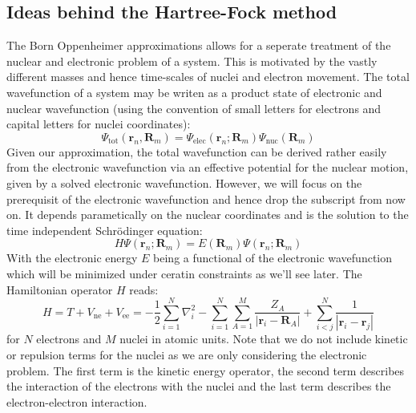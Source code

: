 \subsection{Ideas behind the Hartree-Fock method}
\label{subsec:background_hf}
The Born Oppenheimer approximations allows for a seperate treatment of the nuclear and electronic problem of a system. This is motivated by the vastly different masses and hence time-scales of nuclei and electron movement. The total wavefunction of a system may be writen as a product state of electronic and nuclear wavefunction (using the convention of small letters for electrons and capital letters for nuclei coordinates):
\begin{equation}
    \Psi_{\text{tot}}(\mathbf{r}_n, \mathbf{R}_m) = \Psi_{\text{elec}}(\mathbf{r}_n; \mathbf{R}_m) \Psi_{\text{nuc}}(\mathbf{R}_m)
\end{equation}
Given our approximation, the total wavefunction can be derived rather easily from the electronic wavefunction via an effective potential for the nuclear motion, given by a solved electronic wavefunction. However, we will focus on the prerequisit of the electronic wavefunction and hence drop the subscript from now on. It depends parametically on the nuclear coordinates and is the solution to the time independent Schrödinger equation:
\begin{equation}
    H \Psi(\mathbf{r}_n; \mathbf{R}_m) = E(\mathbf{R}_m) \Psi(\mathbf{r}_n; \mathbf{R}_m)
\end{equation}
With the electronic energy $E$ being a functional of the electronic wavefunction which will be minimized under ceratin constraints as we'll see later. 
The Hamiltonian operator $H$ reads: 
\begin{equation}
    H = T + V_{\text{ne}} + V_{\text{ee}} = -\frac{1}{2} \sum_{i=1}^N \nabla_i^2 - \sum_{i=1}^N \sum_{A=1}^M \frac{Z_A}{|\mathbf{r}_i - \mathbf{R}_A|} + \sum_{i<j}^N \frac{1}{|\mathbf{r}_i - \mathbf{r}_j|}
\end{equation}
for $N$ electrons and $M$ nuclei in atomic units. Note that we do not include kinetic or repulsion terms for the nuclei as we are only considering the electronic problem. The first term is the kinetic energy operator, the second term describes the interaction of the electrons with the nuclei and the last term describes the electron-electron interaction.\\

